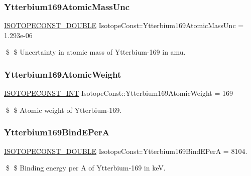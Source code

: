 \subsubsection{\texorpdfstring{Ytterbium169\+Atomic\+Mass\+Unc}{Ytterbium169AtomicMassUnc}}
{\footnotesize\ttfamily \mbox{\hyperlink{group___isotope_const-_macros_ga8f45a7272ce02c0b4c65c44636ed719a}{I\+S\+O\+T\+O\+P\+E\+C\+O\+N\+S\+T\+\_\+\+D\+O\+U\+B\+LE}} Isotope\+Const\+::\+Ytterbium169\+Atomic\+Mass\+Unc = 1.\+293e-\/06}

\$ \$ Uncertainty in atomic mass of Ytterbium-\/169 in amu. \mbox{\label{group___isotope_const-_ytterbium-_yb169_gafb1c5eeac1d4f0df6bae0eadcb539f8f}} 
\subsubsection{\texorpdfstring{Ytterbium169\+Atomic\+Weight}{Ytterbium169AtomicWeight}}
{\footnotesize\ttfamily \mbox{\hyperlink{group___isotope_const-_macros_ga5f18360b3e99483a35c32d789e62621c}{I\+S\+O\+T\+O\+P\+E\+C\+O\+N\+S\+T\+\_\+\+I\+NT}} Isotope\+Const\+::\+Ytterbium169\+Atomic\+Weight = 169}

\$ \$ Atomic weight of Ytterbium-\/169. \mbox{\label{group___isotope_const-_ytterbium-_yb169_ga2f20ce8236476d05c4ffc5e333524c1c}} 
\subsubsection{\texorpdfstring{Ytterbium169\+Bind\+E\+PerA}{Ytterbium169BindEPerA}}
{\footnotesize\ttfamily \mbox{\hyperlink{group___isotope_const-_macros_ga8f45a7272ce02c0b4c65c44636ed719a}{I\+S\+O\+T\+O\+P\+E\+C\+O\+N\+S\+T\+\_\+\+D\+O\+U\+B\+LE}} Isotope\+Const\+::\+Ytterbium169\+Bind\+E\+PerA = 8104.}

\$ \$ Binding energy per A of Ytterbium-\/169 in keV. \mbox{\label{group___isotope_const-_ytterbium-_yb169_ga8f2dca6d5d6a80e7a131921914a21488}} 
